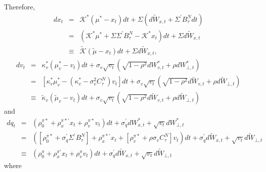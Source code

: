 \documentclass{article}
\begin{document}
Therefore,%
\begin{eqnarray*}
dx_{t} &=&\mathcal{K}^{\ast }\left( \mu ^{\ast }-x_{t}\right) dt+\Sigma
\left( d\tilde{W}_{x,t}+\Sigma ^{\prime }B_{\tau }^{N}dt\right)  \\
&=&\left( \mathcal{K}^{\ast }\mu ^{\ast }+\Sigma \Sigma ^{\prime }B_{\tau
}^{N}-\mathcal{K}^{\ast }x_{t}\right) dt+\Sigma d\tilde{W}_{x,t} \\
&\equiv &\mathcal{\tilde{K}}\left( \tilde{\mu}-x_{t}\right) dt+\Sigma d%
\tilde{W}_{x,t},
\end{eqnarray*}%
\begin{eqnarray*}
dv_{t} &=&\kappa _{v}^{\ast }\left( \mu _{v}^{\ast }-v_{t}\right) dt+\sigma
_{v}\sqrt{v_{t}}\left( \sqrt{1-\rho ^{2}}dW_{v,t}^{\ast }+\rho dW_{\bot
,t}^{\ast }\right)  \\
&=&\left[ \kappa _{v}^{\ast }\mu _{v}^{\ast }-\left( \kappa _{v}^{\ast
}-\sigma _{v}^{2}C_{\tau }^{N}\right) v_{t}\right] dt+\sigma _{v}\sqrt{v_{t}}%
\left( \sqrt{1-\rho ^{2}}d\tilde{W}_{v,t}+\rho d\tilde{W}_{\bot ,t}\right) 
\\
&\equiv &\tilde{\kappa}_{v}\left( \tilde{\mu}_{v}-v_{t}\right) dt+\sigma _{v}%
\sqrt{v_{t}}\left( \sqrt{1-\rho ^{2}}d\tilde{W}_{v,t}+\rho d\tilde{W}_{\bot
,t}\right) 
\end{eqnarray*}%
and%
\begin{eqnarray*}
dq_{t} &=&\left( \rho _{0}^{\pi \ast }+\rho _{x}^{\pi \ast \prime
}x_{t}+\rho _{v}^{\pi \ast }v_{t}\right) dt+\sigma _{q}^{\prime
}dW_{x,t}^{\ast }+\sqrt{v_{t}}dW_{\bot ,t}^{\ast } \\
&=&\left( \left[ \rho _{0}^{\pi \ast }+\sigma _{q}^{\prime }\Sigma ^{\prime
}B_{\tau }^{N}\right] +\rho _{x}^{\pi \ast \prime }x_{t}+\left[ \rho
_{v}^{\pi \ast }+\rho \sigma _{v}C_{\tau }^{N}\right] v_{t}\right) dt+\sigma
_{q}^{\prime }d\tilde{W}_{x,t}+\sqrt{v_{t}}d\tilde{W}_{\bot ,t} \\
&\equiv &\left( \rho _{0}^{\pi }+\rho _{x}^{\pi \prime }x_{t}+\rho _{v}^{\pi
}v_{t}\right) dt+\sigma _{q}^{\prime }d\tilde{W}_{x,t}+\sqrt{v_{t}}d\tilde{W}%
_{\bot ,t}
\end{eqnarray*}%
where 
\end{document}
